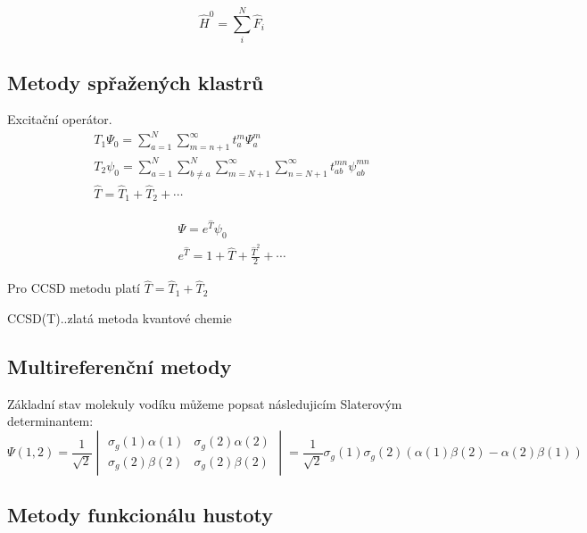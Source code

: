 \begin{equation}
\hat{H}^0=\sum_i^N\hat{F}_i
\end{equation}



\subsection{Metody spřažených klastrů}

Excitační operátor.
\begin{eqnarray}
T_1\Psi_0=\sum^N_{a=1}\sum_{m=n+1}^\infty t_a^m\Psi_a^m \\
T_2\psi_0=\sum_{a=1}^N \sum_{b\neq a}^N\sum_{m=N+1}^\infty \sum_{n=N+1}^\infty t_{ab}^{mn}\psi_{ab}^{mn} \\
\hat{T}=\hat{T}_1+\hat{T}_2+\cdots
\end{eqnarray}

\begin{eqnarray}
\Psi = e^{\hat{T}} \psi_0 \\
e^{\hat{T}} = 1+\hat{T}+\frac{\hat{T}^2}{2}+\cdots
\end{eqnarray}

Pro CCSD metodu platí $\hat{T}=\hat{T}_1+\hat{T}_2$

CCSD(T)..zlatá metoda kvantové chemie

\subsection{Multireferenční metody}

Základní stav molekuly vodíku můžeme popsat následujicím Slaterovým determinantem:
\begin{equation}
\Psi (1,2)=\frac{1}{\sqrt{2}}
\begin{vmatrix}
\sigma_g(1)\alpha (1) & \sigma_g(2)\alpha (2) \\
\sigma_g(2)\beta (2) & \sigma_g(2)\beta (2)
\end{vmatrix}
=\frac{1}{\sqrt{2}}\sigma_g(1)\sigma_g(2)(\alpha (1)\beta (2)-\alpha (2)\beta (1))
\end{equation}

\subsection{Metody funkcionálu hustoty}


